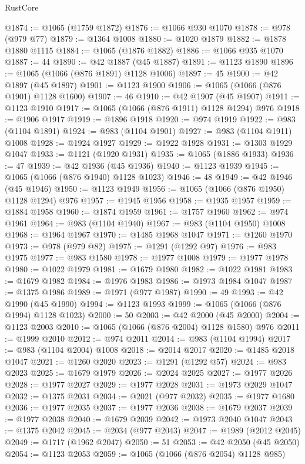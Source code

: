\begin{lexlean}{RustCore}
\begin{coremodule}
@1874 := @1065 (@1759 @1872)
@1876 := @1066 @930 @1070
@1878 := @978 (@979 @77)
@1879 := @1364 @1008
@1880 := @1020 @1879
@1882 := @1878 @1880 @1115
@1884 := @1065 (@1876 @1882)
@1886 := @1066 @935 @1070
@1887 := 44
@1890 := @42 @1887 (@45 @1887)
@1891 := @1123 @1890
@1896 := @1065 (@1066 (@876 @1891) @1128 @1006)
@1897 := 45
@1900 := @42 @1897 (@45 @1897)
@1901 := @1123 @1900
@1906 := @1065 (@1066 (@876 @1901) @1128 @1600)
@1907 := 46
@1910 := @42 @1907 (@45 @1907)
@1911 := @1123 @1910
@1917 := @1065 (@1066 (@876 @1911) @1128 @1294) @976
@1918 := @1906 @1917
@1919 := @1896 @1918
@1920 := @974 @1919
@1922 := @983 (@1104 @1891)
@1924 := @983 (@1104 @1901)
@1927 := @983 (@1104 @1911) @1008
@1928 := @1924 @1927
@1929 := @1922 @1928
@1931 := @1303 @1929 @1047
@1933 := @1121 (@1920 @1931)
@1935 := @1065 (@1886 @1933)
@1936 := 47
@1939 := @42 @1936 (@45 @1936)
@1940 := @1123 @1939
@1945 := @1065 (@1066 (@876 @1940) @1128 @1023)
@1946 := 48
@1949 := @42 @1946 (@45 @1946)
@1950 := @1123 @1949
@1956 := @1065 (@1066 (@876 @1950) @1128 @1294) @976
@1957 := @1945 @1956
@1958 := @1935 @1957
@1959 := @1884 @1958
@1960 := @1874 @1959
@1961 := @1757 @1960
@1962 := @974 @1961
@1964 := @983 (@1104 @1940)
@1967 := @983 (@1104 @1950) @1008
@1968 := @1964 @1967
@1970 := @1485 @1968 @1047
@1971 := @1260 @1970
@1973 := @978 (@979 @82)
@1975 := @1291 (@1292 @97)
@1976 := @983 @1975
@1977 := @983 @1580
@1978 := @1977 @1008
@1979 := @1977 @1978
@1980 := @1022 @1979
@1981 := @1679 @1980
@1982 := @1022 @1981
@1983 := @1679 @1982
@1984 := @1976 @1983
@1986 := @1973 @1984 @1047
@1987 := @1375 @1986
@1989 := @1971 (@977 @1987)
@1990 := 49
@1993 := @42 @1990 (@45 @1990)
@1994 := @1123 @1993
@1999 := @1065 (@1066 (@876 @1994) @1128 @1023)
@2000 := 50
@2003 := @42 @2000 (@45 @2000)
@2004 := @1123 @2003
@2010 := @1065 (@1066 (@876 @2004) @1128 @1580) @976
@2011 := @1999 @2010
@2012 := @974 @2011
@2014 := @983 (@1104 @1994)
@2017 := @983 (@1104 @2004) @1008
@2018 := @2014 @2017
@2020 := @1485 @2018 @1047
@2021 := @1260 @2020
@2023 := @1291 (@1292 @57)
@2024 := @983 @2023
@2025 := @1679 @1979
@2026 := @2024 @2025
@2027 := @1977 @2026
@2028 := @1977 @2027
@2029 := @1977 @2028
@2031 := @1973 @2029 @1047
@2032 := @1375 @2031
@2034 := @2021 (@977 @2032)
@2035 := @1977 @1680
@2036 := @1977 @2035
@2037 := @1977 @2036
@2038 := @1679 @2037
@2039 := @1977 @2038
@2040 := @1679 @2039
@2042 := @1973 @2040 @1047
@2043 := @1375 @2042
@2045 := @2034 (@977 @2043)
@2047 := @1989 (@2012 @2045)
@2049 := @1717 (@1962 @2047)
@2050 := 51
@2053 := @42 @2050 (@45 @2050)
@2054 := @1123 @2053
@2059 := @1065 (@1066 (@876 @2054) @1128 @985)

\end{coremodule}
\end{lexlean}
